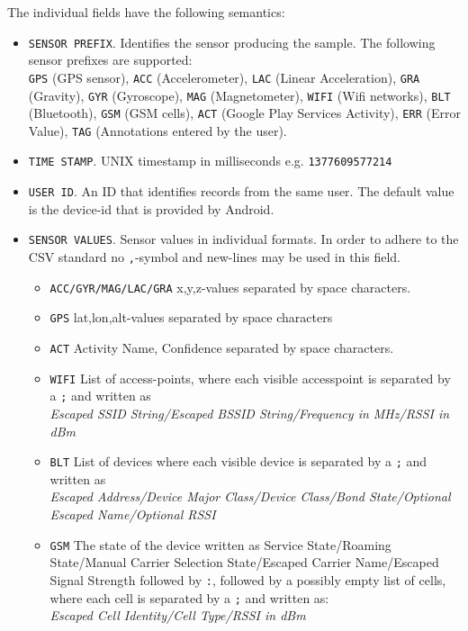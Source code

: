 \clearpage
The individual fields have the following semantics:
\begin{itemize}
\item \texttt{SENSOR PREFIX}. Identifies the sensor producing the
  sample. The following sensor prefixes are supported: \\
  \texttt{GPS} (GPS sensor), \texttt{ACC} (Accelerometer),
  \texttt{LAC} (Linear Acceleration), \texttt{GRA} (Gravity),
  \texttt{GYR} (Gyroscope), \texttt{MAG} (Magnetometer), \texttt{WIFI}
  (Wifi networks), \texttt{BLT} (Bluetooth), \texttt{GSM} (GSM cells),
  \texttt{ACT} (Google Play Services Activity), \texttt{ERR} (Error
  Value), \texttt{TAG} (Annotations entered by the user).
\item \texttt{TIME STAMP}. UNIX timestamp in milliseconds
  e.g. \texttt{1377609577214}
\item \texttt{USER ID}. An ID that identifies records from the same
  user. The default value is the device-id that is provided by
  Android.
\item \texttt{SENSOR VALUES}. Sensor values in individual formats. In
  order to adhere to the CSV standard no \texttt{,}-symbol and
  new-lines may be used in this field.
  \begin{itemize}
  \item \texttt{ACC/GYR/MAG/LAC/GRA} x,y,z-values separated by space characters.
  \item \texttt{GPS} lat,lon,alt-values separated by space characters
  \item \texttt{ACT} Activity Name, Confidence separated by space characters.
  \item \texttt{WIFI} List of access-points, where each visible
    accesspoint is separated by a \texttt{;} and written as \\
    {\it Escaped SSID String/Escaped BSSID String/Frequency in MHz/RSSI in dBm}
  \item \texttt{BLT}
    List of devices where each visible device is separated by a \texttt{;}
    and written as \\
    { \it Escaped Address/Device Major Class/Device Class/Bond
      State/Optional Escaped Name/Optional RSSI }
  \item \texttt{GSM}
    The state of the device written as Service State/Roaming State/Manual
    Carrier Selection State/Escaped Carrier Name/Escaped Signal Strength
    followed by \texttt{:}, followed by a possibly empty list of cells,
    where each cell is separated by a \texttt{;} and written as: \\
    {\it Escaped Cell Identity/Cell Type/RSSI in dBm}
  \end{itemize}
\end{itemize}

